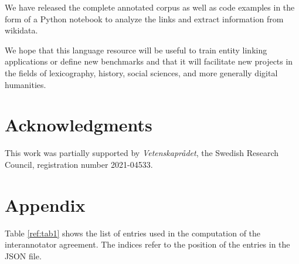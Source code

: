 \documentclass[10pt, a4paper]{article}
\begin{document}
We have released the complete annotated corpus as well as code examples in the form of a Python notebook to analyze the links and extract information from wikidata.

We hope that this language resource will be useful to train entity linking applications or define new benchmarks and that it will facilitate new projects in the fields of lexicography, history, social sciences, and more generally digital humanities.

\section{Acknowledgments}
This work was partially supported by \textit{Vetenskaprådet}, the Swedish Research Council, registration number 2021-04533.

\section*{Appendix}
Table \ref{ref:tab1} shows the list of entries used in the computation of the interannotator agreement. The indices refer to the position of the entries in the JSON file.
\end{document}
